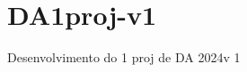 \chapter{DA1proj-\/v1}
\hypertarget{md__r_e_a_d_m_e}{}\label{md__r_e_a_d_m_e}
\label{md__r_e_a_d_m_e_autotoc_md0}%
%
Desenvolvimento do 1 proj de DA 2024v 1 